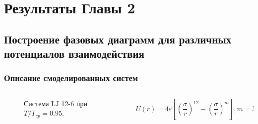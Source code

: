 \documentclass[pdf,hyperref={unicode}]{beamer}
\begin{document}
\section{Результаты Главы 2}

\subsection{Построение фазовых диаграмм для различных потенциалов взаимодействия}


\begin{frame}
\transdissolve[duration=0.2]
\frametitle{Описание смоделированных систем}

\begin{columns}

\begin{column}{0.45\linewidth}
\begin{figure}[h]

\caption{\tiny Система LJ 12-6 при $T / T_{cp} = 0.95$.}
\end{figure}
\end{column}

\begin{column}{0.5\linewidth}
\tiny{

\begin{equation}
U(r) = 4\varepsilon \left[ \left(\frac{\sigma}{r}\right)^{12} - \left(\frac{\sigma}{r}\right)^{m} \right], m = 3, 4, 5, 6.
\label{eqLJ}
\end{equation}

}
\end{column}
\end{columns}
\end{frame}
\end{document}
